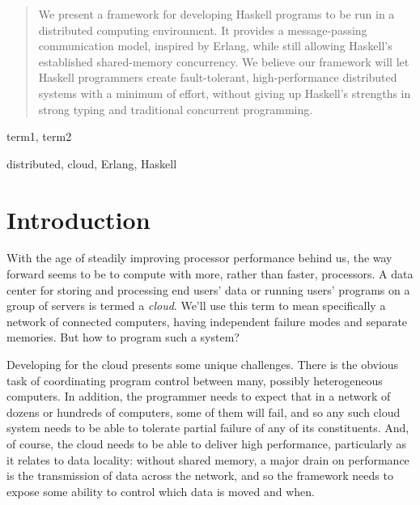 \documentclass[preprint]{sigplanconf}
\begin{document}
\maketitle

\begin{abstract}
We present a framework for developing Haskell programs to be run in a distributed computing environment. It provides a message-passing communication model, inspired by Erlang, while still allowing Haskell's established shared-memory concurrency. We believe our framework will let Haskell programmers create fault-tolerant, high-performance distributed systems with a minimum of effort, without giving up Haskell's strengths in strong typing and traditional concurrent programming.

\end{abstract}


\terms
term1, term2

\keywords
distributed, cloud, Erlang, Haskell

\section{Introduction}

With the age of steadily improving processor performance behind us, the way forward seems to be to compute with more, rather than faster, processors. A data center for storing and processing end users' data or running users' programs on a  group of servers is termed a {\em cloud}. We'll use this term to mean specifically a network of connected computers, having independent failure modes and separate memories. But how to program such a system?

Developing for the cloud presents some unique challenges. There is the obvious task of coordinating program control between many, possibly heterogeneous computers. In addition, the programmer needs to expect that in a network of dozens or hundreds of computers, some of them will fail, and so any such cloud system needs to be able to tolerate partial failure of any of its constituents. And, of course, the cloud needs to be able to deliver high performance, particularly as it relates to data locality: without shared memory, a major drain on performance is the transmission of data across the network, and so the framework needs to expose some ability to control which data is moved and when.
\end{document}
